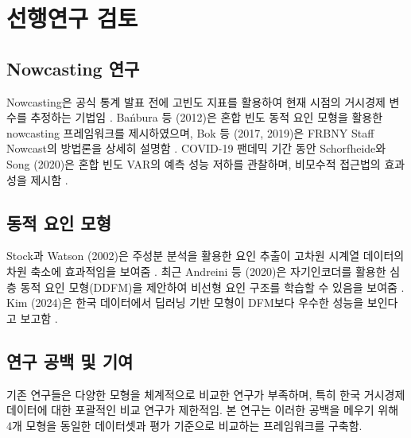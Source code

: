 \section{선행연구 검토}

\subsection{Nowcasting 연구}

Nowcasting은 공식 통계 발표 전에 고빈도 지표를 활용하여 현재 시점의 거시경제 변수를 추정하는 기법임 \cite{banbura2012nowcasting}. Bańbura 등 (2012)은 혼합 빈도 동적 요인 모형을 활용한 nowcasting 프레임워크를 제시하였으며, Bok 등 (2017, 2019)은 FRBNY Staff Nowcast의 방법론을 상세히 설명함 \cite{bok2017macroeconomic, bok2019frbny}. COVID-19 팬데믹 기간 동안 Schorfheide와 Song (2020)은 혼합 빈도 VAR의 예측 성능 저하를 관찰하며, 비모수적 접근법의 효과성을 제시함 \cite{schorfheide2020nowcasting}.

\subsection{동적 요인 모형}

Stock과 Watson (2002)은 주성분 분석을 활용한 요인 추출이 고차원 시계열 데이터의 차원 축소에 효과적임을 보여줌 \cite{stock2002forecasting}. 최근 Andreini 등 (2020)은 자기인코더를 활용한 심층 동적 요인 모형(DDFM)을 제안하여 비선형 요인 구조를 학습할 수 있음을 보여줌 \cite{andreini2020deep}. Kim (2024)은 한국 데이터에서 딥러닝 기반 모형이 DFM보다 우수한 성능을 보인다고 보고함 \cite{kim2024deep}.

\subsection{연구 공백 및 기여}

기존 연구들은 다양한 모형을 체계적으로 비교한 연구가 부족하며, 특히 한국 거시경제 데이터에 대한 포괄적인 비교 연구가 제한적임. 본 연구는 이러한 공백을 메우기 위해 4개 모형을 동일한 데이터셋과 평가 기준으로 비교하는 프레임워크를 구축함.
